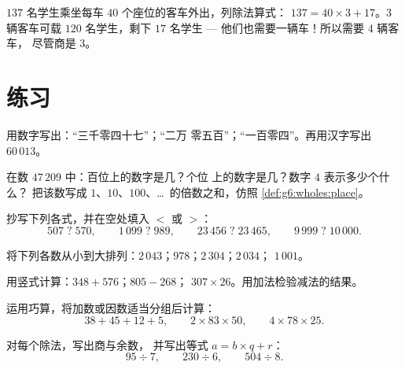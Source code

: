 \begin{example}\label{ex:g6:wholes:bus}
$137$ 名学生乘坐每车 $40$ 个座位的客车外出，列除法算式：
$137 = 40 \times 3 + 17$。3 辆客车可载 $120$ 名学生，剩下 $17$
名学生 --- 他们也需要一辆车！所以需要 $4$ 辆客车，
尽管商是 $3$。
\end{example}

\section{练习}

\begin{exercise}[$\star$]\label{exo:g6:wholes:1}
用数字写出：“三千零四十七”；“二万
零五百”；“一百零四”。再用汉字写出 $60\,013$。
\end{exercise}

\begin{exercise}[$\star$]\label{exo:g6:wholes:2}
在数 $47\,209$ 中：百位上的数字是几？个位
上的数字是几？数字 $4$ 表示多少个什么？
把该数写成 $1$、$10$、$100$、\dots\ 的倍数之和，仿照
\cref{def:g6:wholes:place}。
\end{exercise}

\begin{exercise}[$\star$]\label{exo:g6:wholes:3}
抄写下列各式，并在空处填入 $<$ 或 $>$：
\[
507 \;?\; 570, \qquad
1\,099 \;?\; 989, \qquad
23\,456 \;?\; 23\,465, \qquad
9\,999 \;?\; 10\,000 .
\]
\end{exercise}

\begin{exercise}[$\star$]\label{exo:g6:wholes:4}
将下列各数从小到大排列：$2\,043$；$978$；$2\,304$；$2\,034$；
$1\,001$。
\end{exercise}

\begin{exercise}[$\star$]\label{exo:g6:wholes:5}
用竖式计算：$348 + 576$；\quad $805 - 268$；\quad
$307 \times 26$。用加法检验减法的结果。
\end{exercise}

\begin{exercise}[$\star$]\label{exo:g6:wholes:6}
运用巧算，将加数或因数适当分组后计算：
\[
38 + 45 + 12 + 5, \qquad
2 \times 83 \times 50, \qquad
4 \times 78 \times 25 .
\]
\end{exercise}

\begin{exercise}[$\star$]\label{exo:g6:wholes:7}
对每个除法，写出商与余数，
并写出等式 $a = b \times q + r$：
\[
95 \div 7, \qquad
230 \div 6, \qquad
504 \div 8 .
\]
\end{exercise}

